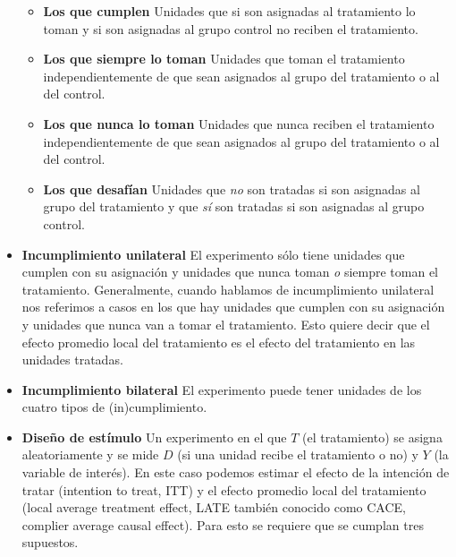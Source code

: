 \documentclass[12pt,spanish,]{book}
\providecommand{\tightlist}{%
  \setlength{\itemsep}{0pt}\setlength{\parskip}{0pt}}
\begin{document}
\begin{itemize}
  \begin{itemize}
  \tightlist
  \item
    \textbf{Los que cumplen} Unidades que si son asignadas al tratamiento lo toman y si son asignadas al grupo control no reciben el tratamiento.
  \item
    \textbf{Los que siempre lo toman} Unidades que toman el tratamiento independientemente de que sean asignados al grupo del tratamiento o al del control.
  \item
    \textbf{Los que nunca lo toman} Unidades que nunca reciben el tratamiento independientemente de que sean asignados al grupo del tratamiento o al del control.
  \item
    \textbf{Los que desafían} Unidades que \emph{no} son tratadas si son asignadas al grupo del tratamiento y que \emph{sí} son tratadas si son asignadas al grupo control.
  \end{itemize}
\item
  \textbf{Incumplimiento unilateral} El experimento sólo tiene unidades que cumplen con su asignación y unidades que nunca toman \emph{o} siempre toman el tratamiento. Generalmente, cuando hablamos de incumplimiento unilateral nos referimos a casos en los que hay unidades que cumplen con su asignación y unidades que nunca van a tomar el tratamiento. Esto quiere decir que el efecto promedio local del tratamiento es el efecto del tratamiento en las unidades tratadas.
\item
  \textbf{Incumplimiento bilateral} El experimento puede tener unidades de los cuatro tipos de (in)cumplimiento.
\item
  \textbf{Diseño de estímulo} Un experimento en el que \(T\) (el tratamiento) se asigna aleatoriamente y se mide \(D\) (si una unidad recibe el tratamiento o no) y \(Y\) (la variable de interés). En este caso podemos estimar el efecto de la intención de tratar (intention to treat, ITT) y el efecto promedio local del tratamiento (local average treatment effect, LATE también conocido como CACE, complier average causal effect). Para esto se requiere que se cumplan tres supuestos.


\end{itemize}
\end{document}
